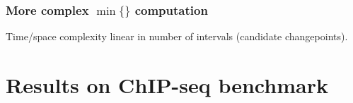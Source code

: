 \documentclass{beamer}
\begin{document}
\begin{frame}
  \frametitle{More complex $\min\{\}$ computation}
  Time/space complexity linear in number of intervals (candidate changepoints).
  \begin{minipage}[t]{\linewidth}
  \hskip -1cm
   
  \end{minipage}
\end{frame}








\section{Results on ChIP-seq benchmark}
\end{document}
